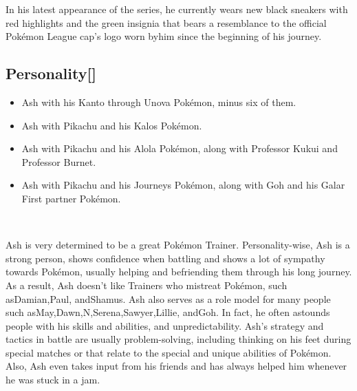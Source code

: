 \documentclass[a4paper,12pt]{article}
\begin{document}
In his latest appearance of the series, he currently wears new black sneakers with red highlights and the green insignia that bears a resemblance to the official Pokémon League cap's logo worn byhim since the beginning of his journey.\\ \par \vspace{0.5cm}

\subsection*{Personality[]}\n\n\begin{itemize}
\item Ash with his Kanto through Unova Pokémon, minus six of them.
\item Ash with Pikachu and his Kalos Pokémon.
\item Ash with Pikachu and his Alola Pokémon, along with Professor Kukui and Professor Burnet.
\item Ash with Pikachu and his Journeys Pokémon, along with Goh and his Galar First partner Pokémon.
\end{itemize}\\ \par \vspace{0.5cm}

Ash is very determined to be a great Pokémon Trainer. Personality-wise, Ash is a strong person, shows confidence when battling and shows a lot of sympathy towards Pokémon, usually helping and befriending them through his long journey. As a result, Ash doesn't like Trainers who mistreat Pokémon, such asDamian,Paul, andShamus. Ash also serves as a role model for many people such asMay,Dawn,N,Serena,Sawyer,Lillie, andGoh. In fact, he often astounds people with his skills and abilities, and unpredictability. Ash's strategy and tactics in battle are usually problem-solving, including thinking on his feet during special matches or that relate to the special and unique abilities of Pokémon. Also, Ash even takes input from his friends and has always helped him whenever he was stuck in a jam.\\ \par \vspace{0.5cm}
\end{document}

